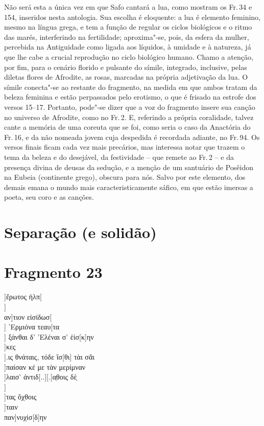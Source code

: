 {Não será esta a única vez em que Safo cantará a lua,
como mostram os Fr.\,34 e 154, inseridos nesta antologia. Sua escolha é
eloquente: a lua é elemento feminino, mesmo na língua grega, e tem a função de
regular os ciclos biológicos e o ritmo das marés, interferindo na fertilidade;
aproxima"-se, pois, da esfera da mulher, percebida na Antiguidade como ligada
aos líquidos, à umidade e à natureza, já que lhe cabe a crucial
reprodução no ciclo biológico humano. Chamo a atenção, por fim, para o cenário
florido e pulsante do símile, integrado, inclusive, pelas diletas flores de
Afrodite, as rosas, marcadas na própria adjetivação da lua. O símile conecta"-se
ao restante do fragmento, na medida em que ambos tratam da beleza feminina e
estão perpassados pelo erotismo, o que é frisado na estrofe dos versos 15--17.
Portanto, pode"-se dizer que a voz do fragmento insere sua canção no universo de
Afrodite, como no Fr.\,2.
E, referindo a própria coralidade, talvez cante a memória de uma coreuta que se foi, como seria o caso da Anactória do Fr.\,16, e da não nomeada jovem cuja despedida é recordada adiante, no Fr.\,94.
Os versos finais ficam cada vez mais precários, mas interessa notar que trazem o tema da beleza e do desejável, da festividade -- que remete ao Fr.\,2 -- e da presença divina de deusas da sedução, e a menção de um santuário de Posêidon na Eubeia (continente grego), obscura para nós. Salvo por este elemento, dos demais emana o mundo mais caracteristicamente sáfico, em que estão imersas a poeta, seu coro e as canções.}





\pagebreak
\section{Separação (e solidão)}
\section{Fragmento 23}

\begin{gkverse}
]ἕρωτος  ἠλπ[\\
		       ]\\
		   αν]τιον εἰσίδωσ[\\
		       ] ’Ερμιόνα τεαυ[τα\\
	   ] ξάνθαι δ’ ’Ελέναι σ’ ἑίσ[κ]ην\\
	]κες \\
	].ις θνάταις, τόδε ἴσ[θι] τὰι σᾶι\\
	]παίσαν κέ με τὰν μερίμναν\\
	]λαισ’ ἀντιδ[..][.]α̣θοις δὲ̣\\
     ]\\
				]τας ὄχθοις\\
			          ]ταιν\\
			      παν]νυχίσ[δ]ην
\end{gkverse}

